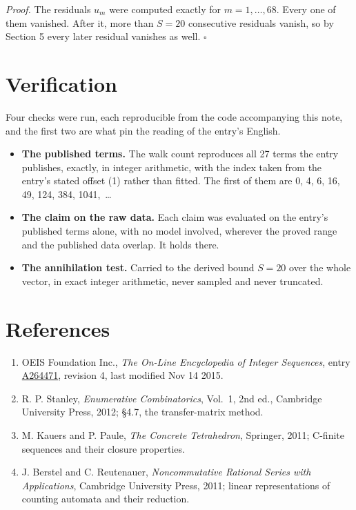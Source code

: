 \documentclass[11pt]{article}
\theoremstyle{definition}
\begin{document}
{\itshape Proof.} The residuals $u_m$ were computed exactly for $m = 1,\dots,68$. Every one of them vanished. After it, more than $S = 20$ consecutive residuals vanish, so by Section 5 every later residual vanishes as well. $\square$

\section{Verification}

Four checks were run, each reproducible from the code accompanying this note, and the first two are what pin the reading of the entry's English.

\begin{itemize}

\item {\bfseries The published terms.} The walk count reproduces all 27 terms the entry publishes, exactly, in integer arithmetic, with the index taken from the entry's stated offset (1) rather than fitted. The first of them are 0, 4, 6, 16, 49, 124, 384, 1041,~\dots

\item {\bfseries The claim on the raw data.} Each claim was evaluated on the entry's published terms alone, with no model involved, wherever the proved range and the published data overlap. It holds there.

\item {\bfseries The annihilation test.} Carried to the derived bound $S = 20$ over the whole vector, in exact integer arithmetic, never sampled and never truncated.

\end{itemize}

\section{References}

\begin{enumerate}

\item OEIS Foundation Inc., \emph{The On-Line Encyclopedia of Integer Sequences}, entry \href{https://oeis.org/A264471}{A264471}, revision 4, last modified Nov 14 2015.

\item R. P. Stanley, \emph{Enumerative Combinatorics}, Vol.~1, 2nd ed., Cambridge University Press, 2012; \S4.7, the transfer-matrix method.

\item M. Kauers and P. Paule, \emph{The Concrete Tetrahedron}, Springer, 2011; C-finite sequences and their closure properties.

\item J. Berstel and C. Reutenauer, \emph{Noncommutative Rational Series with Applications}, Cambridge University Press, 2011; linear representations of counting automata and their reduction.

\end{enumerate}
\end{document}
